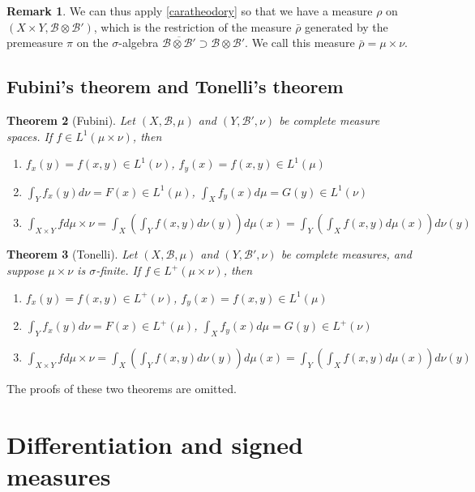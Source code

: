 \documentclass[11pt]{amsart}
\newtheorem{theorem}{Theorem}[section]
\theoremstyle{definition}
\newtheorem{remark}[theorem]{Remark}
\numberwithin{equation}{section}
\begin{document}
\begin{remark}
    We can thus apply \ref{caratheodory} so that we have a measure $\rho$ on $(X\times Y,\mathcal B\otimes\mathcal B')$, which is the restriction of the measure $\bar\rho$ generated by the premeasure $\pi$ on the $\sigma$-algebra $\overline{\mathcal B\otimes \mathcal B'}\supset\mathcal B\otimes\mathcal B'$. We call this measure $\bar\rho=\mu\times \nu$.
\end{remark}
\subsection{Fubini's theorem and Tonelli's theorem}
\begin{theorem}[Fubini]
    Let $(X,\mathcal B,\mu)$ and $(Y,\mathcal B',\nu)$ be complete measure spaces. If $f\in L^1(\mu\times \nu)$, then
    \begin{enumerate}
        \item [(i)] $f_x(y)=f(x,y)\in L^1(\nu)$, $f_y(x)=f(x,y)\in L^1(\mu)$
        \item [(ii)] $\int_Yf_x(y)d\nu=F(x)\in L^1(\mu)$, $\int_Xf_y(x)d\mu=G(y)\in L^1(\nu)$
        \item [(iii)] $\int_{X\times Y}fd\mu\times \nu=\int_X(\int_Yf(x,y)d\nu(y))d\mu(x)=\int_Y(\int_Xf(x,y)d\mu(x))d\nu(y)$
    \end{enumerate}
\end{theorem}
\begin{theorem}[Tonelli]
    Let $(X,\mathcal B,\mu)$ and $(Y,\mathcal B',\nu)$ be complete measures, and suppose $\mu\times\nu$ is $\sigma$-finite. If $f\in L^+(\mu\times \nu)$, then 
    \begin{enumerate}
        \item [(i)] $f_x(y)=f(x,y)\in L^+(\nu)$, $f_y(x)=f(x,y)\in L^1(\mu)$
        \item [(ii)] $\int_Yf_x(y)d\nu=F(x)\in L^+(\mu)$, $\int_Xf_y(x)d\mu=G(y)\in L^+(\nu)$
        \item [(iii)] $\int_{X\times Y}fd\mu\times \nu=\int_X(\int_Yf(x,y)d\nu(y))d\mu(x)=\int_Y(\int_Xf(x,y)d\mu(x))d\nu(y)$
    \end{enumerate}
\end{theorem}
The proofs of these two theorems are omitted.
\newpage
\section{Differentiation and signed measures}
\end{document}

